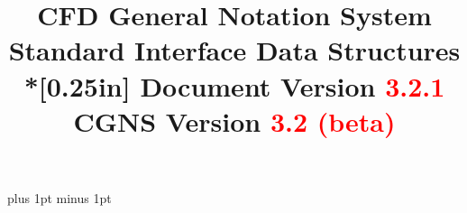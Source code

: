 \documentclass[11pt,twoside]{article}
\newcommand{\clearemptydoublepage}{\newpage{\pagestyle{empty}\cleardoublepage}}
\begin{document}
%
%
%


\fancyfoot[LE,RO]{\bfseries \thepage}

\posttitle{\par\end{flushleft}\vskip 1.0em}
\title{{\bfseries CFD General Notation System\\
Standard Interface Data Structures}\\*[0.25in]
{\Large Document Version \textcolor{red}{3.2.1}\\
CGNS Version \textcolor{red}{3.2 (beta)}}}
\author{}
\date{}
\maketitle
\thispagestyle{empty}


\clearemptydoublepage
\setlength{\parskip}{0ex}		%
\thispagestyle{plain}
\tableofcontents
\listoffigures
\enlargethispage{\baselineskip}
\listoftables
\parskip 5pt plus 1pt minus 1pt

\clearemptydoublepage
{}
\setcounter{secnumdepth}{-2}
\end{document}
